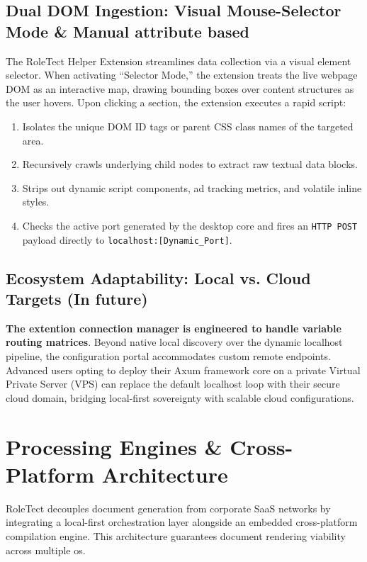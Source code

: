 \documentclass[10pt,a4paper]{article}
\begin{document}
\subsection{Dual DOM Ingestion: Visual Mouse-Selector Mode \& Manual attribute based}
The RoleTect Helper Extension streamlines data collection via a visual element selector. When activating ``Selector Mode,'' the extension treats the live webpage DOM as an interactive map, drawing bounding boxes over content structures as the user hovers. Upon clicking a section, the extension executes a rapid script:
\begin{enumerate}
    \item Isolates the unique DOM ID tags or parent CSS class names of the targeted area.
    \item Recursively crawls underlying child nodes to extract raw textual data blocks.
    \item Strips out dynamic script components, ad tracking metrics, and volatile inline styles.
    \item Checks the active port generated by the desktop core and fires an \texttt{HTTP POST} payload directly to \texttt{localhost:[Dynamic\_Port]}.
\end{enumerate}

\subsection{Ecosystem Adaptability: Local vs. Cloud Targets (In future)}
\textbf{The extention connection manager is engineered to handle variable routing matrices}. Beyond native local discovery over the dynamic localhost pipeline, the configuration portal accommodates custom remote endpoints. Advanced users opting to deploy their Axum framework core on a private Virtual Private Server (VPS) can replace the default localhost loop with their secure cloud domain, bridging local-first sovereignty with scalable cloud configurations.



\vspace{30mm}


\section{Processing Engines \& Cross-Platform Architecture}
RoleTect decouples document generation from corporate SaaS networks by integrating a local-first orchestration layer alongside an embedded cross-platform compilation engine. This architecture guarantees document rendering viability across multiple os.
\end{document}
